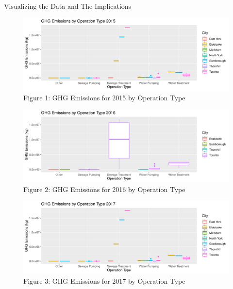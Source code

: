 \documentclass[
  letterpaper,
  DIV=11,
  numbers=noendperiod]{scrartcl}
\begin{document}
Visualizing the Data and The Implications

\begin{figure}

{\centering \includegraphics{paper_files/figure-pdf/unnamed-chunk-4-1.pdf}

}

\caption{Figure 1: GHG Emissions for 2015 by Operation Type}

\end{figure}

\begin{figure}

{\centering \includegraphics{paper_files/figure-pdf/unnamed-chunk-6-1.pdf}

}

\caption{Figure 2: GHG Emissions for 2016 by Operation Type}

\end{figure}

\begin{figure}

{\centering \includegraphics{paper_files/figure-pdf/unnamed-chunk-8-1.pdf}

}

\caption{Figure 3: GHG Emissions for 2017 by Operation Type}

\end{figure}
\end{document}
